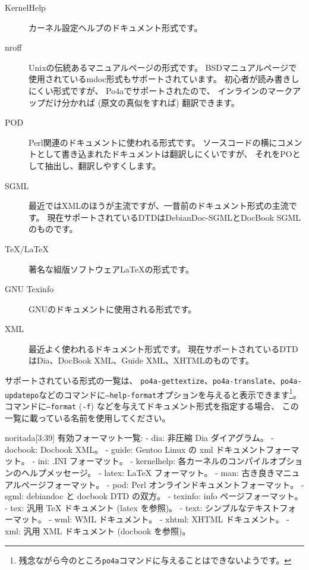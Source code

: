\documentclass[mingoth,a4paper]{jsarticle}
\begin{document}
\begin{description}
 \item[KernelHelp] カーネル設定ヘルプのドキュメント形式です。
 \item[nroff] Unixの伝統あるマニュアルページの形式です。
	    BSDマニュアルページで使用されているmdoc形式もサポートされています。
	    初心者が読み書きしにくい形式ですが、
	    Po4aでサポートされたので、
	    インラインのマークアップだけ分かれば (原文の真似をすれば) 翻訳できます。
 \item[POD] Perl関連のドキュメントに使われる形式です。
	    ソースコードの横にコメントとして書き込まれたドキュメントは翻訳しにくいですが、
	    それをPOとして抽出し、翻訳しやすくします。
 \item[SGML] 最近ではXMLのほうが主流ですが、一昔前のドキュメント形式の主流です。
	    現在サポートされているDTDはDebianDoc-SGMLとDocBook SGMLのものです。
 \item[TeX/LaTeX] 著名な組版ソフトウェア\LaTeX{}の形式です。
 \item[GNU Texinfo] GNUのドキュメントに使用される形式です。
 \item[XML] 最近よく使われるドキュメント形式です。
	    現在サポートされているDTDはDia、DocBook XML、Guide XML、XHTMLのものです。
\end{description}

サポートされている形式の一覧は、
\texttt{po4a-gettextize}、\texttt{po4a-translate}、\texttt{po4a-updatepo}などのコマンドに\texttt{--help-format}オプションを与えると表示できます\footnote{残念ながら今のところ\texttt{po4a}コマンドに与えることはできないようです。}。
コマンドに\texttt{--format} (\texttt{-f}) などを与えてドキュメント形式を指定する場合、
この一覧に載っている名前を使用してください。

\begin{commandline}
noritada[3:39]%
有効フォーマット一覧:
  - dia: 非圧縮 Dia ダイアグラム。
  - docbook: Docbook XML。
  - guide: Gentoo Linux の xml ドキュメントフォーマット。
  - ini: .INI フォーマット。
  - kernelhelp: 各カーネルのコンパイルオプションのヘルプメッセージ。
  - latex: LaTeX フォーマット。
  - man: 古き良きマニュアルページフォーマット。
  - pod: Perl オンラインドキュメントフォーマット。
  - sgml: debiandoc と docbook DTD の双方。
  - texinfo: info ページフォーマット。
  - tex: 汎用 TeX ドキュメント (latex を参照)。
  - text: シンプルなテキストフォーマット。
  - wml: WML ドキュメント。
  - xhtml: XHTML ドキュメント。
  - xml: 汎用 XML ドキュメント (docbook を参照)。
\end{commandline}
\end{document}
